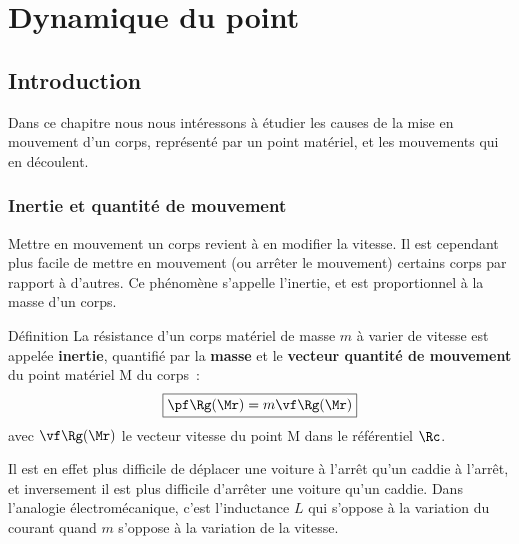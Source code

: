 \documentclass[../main/main.tex]{subfiles}
\begin{document}
\setcounter{chapter}{1}

\chapter{Dynamique du point}

\section{Introduction}
Dans ce chapitre nous nous intéressons à étudier les causes de la mise en
mouvement d'un corps, représenté par un point matériel, et les mouvements qui en
découlent.

\subsection{Inertie et quantité de mouvement}
Mettre en mouvement un corps revient à en modifier la vitesse. Il est cependant
plus facile de mettre en mouvement (ou arrêter le mouvement) certains corps par
rapport à d'autres. Ce phénomène s'appelle l'inertie, et est
proportionnel à la masse d'un corps.

\begin{tdefi}{Définition}
    La résistance d'un corps matériel de masse $m$ à varier de vitesse est
    appelée \textbf{inertie}, quantifié par la \textbf{masse} et le
    \textbf{vecteur quantité de mouvement} du point matériel M du corps~:
    \[\boxed{\pf\Rg(\Mr) = m\vf\Rg(\Mr)}\]
    avec $\vf\Rg(\Mr)$ le vecteur vitesse du point M dans le référentiel $\Rc$.
\end{tdefi}

Il est en effet plus difficile de déplacer une voiture à l'arrêt qu'un caddie à
l'arrêt, et inversement il est plus difficile d'arrêter une voiture qu'un
caddie. Dans l'analogie électromécanique, c'est l'inductance $L$ qui s'oppose à
la variation du courant quand $m$ s'oppose à la variation de la vitesse.
\end{document}
